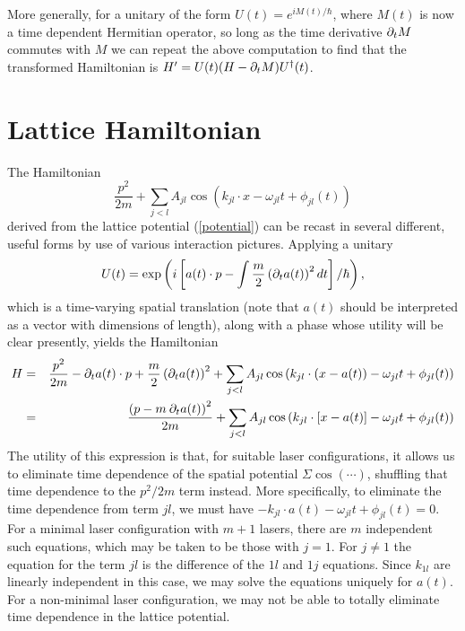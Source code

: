 \documentclass[aps,prb,floatfix,amsmath,amssymb,groupedaddress]{revtex4}
\begin{document}
More generally, for a unitary of the form $U(t) = e^{i M(t)/\hbar}$, where $M(t)$ is now a time dependent Hermitian operator, so long as the time derivative ${\partial_t} M$ commutes with $M$ we can repeat the above computation to find that the transformed Hamiltonian is $H' = U(t)(H-{\partial_t} M)U^\dagger(t)$.


\section{Lattice Hamiltonian}
The Hamiltonian $$\frac{p^2}{2m} + \sum_{j<l} A_{jl} \cos\left( k_{jl} \cdot x - \omega_{jl} t + \phi_{jl}(t)\right)$$ derived from the lattice potential (\ref{potential}) can be recast in several different, useful forms by use of various interaction pictures.  Applying a unitary $$U(t) = \exp\left(i \left[a(t) \cdot p - \int \frac{m}{2}\left( {\partial_t} a(t)\right)^2 dt\right]/\hbar\right),$$ which is a time-varying spatial translation (note that $a(t)$ should be interpreted as a vector with dimensions of length), along with a phase whose utility will be clear presently, yields the Hamiltonian
\begin{eqnarray}
H & = & \frac{p^2}{2m} - {\partial_t} a(t) \cdot p + \frac{m}{2}\left({\partial_t} a(t)\right)^2 + \sum_{j<l} A_{jl} \cos\left(k_{jl} \cdot \left(x-a(t)\right) - \omega_{jl} t + \phi_{jl}(t)\right) \nonumber \\
& = & \frac{\left(p - m \: {\partial_t} a(t)\right)^2}{2m} + \sum_{j<l} A_{jl} \cos\left(k_{jl} \cdot \left[x-a(t)\right] - \omega_{jl} t + \phi_{jl}(t)\right)
\label{sweepH}
\end{eqnarray}
The utility of this expression is that, for suitable laser configurations, it allows us to eliminate time dependence of the spatial potential $\Sigma \cos(\cdots)$, shuffling that time dependence to the $p^2/2m$ term instead.  More specifically, to eliminate the time dependence from term $jl$, we must have $-k_{jl}\cdot a(t) - \omega_{jl}t + \phi_{jl}(t) = 0$.  For a minimal laser configuration with $m+1$ lasers, there are $m$ independent such equations, which may be taken to be those with $j=1$.  For $j\neq 1$ the equation for the term $jl$ is the difference of the $1l$ and $1j$ equations.  Since $k_{1l}$ are linearly independent in this case, we may solve the equations uniquely for $a(t)$.  For a non-minimal laser configuration, we may not be able to totally eliminate time dependence in the lattice potential.  
\end{document}
